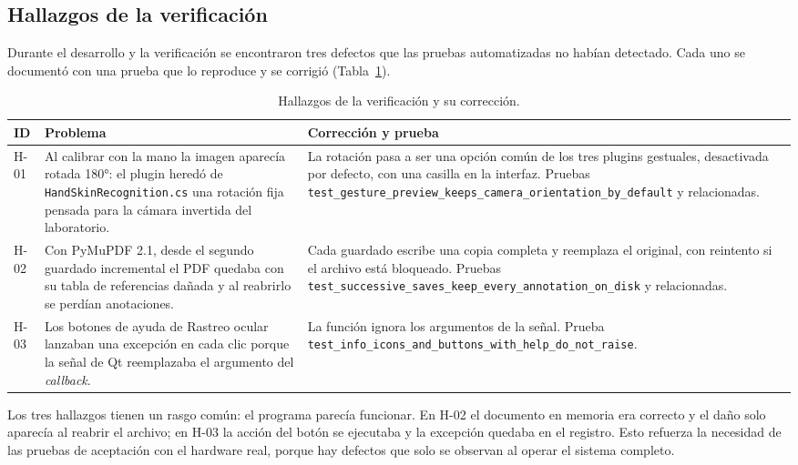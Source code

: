 \subsection{Hallazgos de la verificación}
\label{sec:hallazgos}

Durante el desarrollo y la verificación se encontraron tres defectos que las pruebas automatizadas no habían detectado. Cada uno se documentó con una prueba que lo reproduce y se corrigió (Tabla~\ref{tab:hallazgos_verif}).

\begin{table}[H]
\centering
\caption{Hallazgos de la verificación y su corrección.}
\label{tab:hallazgos_verif}
\footnotesize
\begin{tabularx}{\textwidth}{>{\raggedright\arraybackslash}p{1.1cm} >{\raggedright\arraybackslash}X >{\raggedright\arraybackslash}X}
\toprule
\textbf{ID} & \textbf{Problema} & \textbf{Corrección y prueba} \\ \midrule
H-01 & Al calibrar con la mano la imagen aparecía rotada 180°: el plugin heredó de \texttt{HandSkinRecognition.cs} una rotación fija pensada para la cámara invertida del laboratorio. & La rotación pasa a ser una opción común de los tres plugins gestuales, desactivada por defecto, con una casilla en la interfaz. Pruebas \texttt{test\_gesture\_preview\_keeps\_camera\_orientation\_by\_default} y relacionadas. \\ \midrule
H-02 & Con PyMuPDF 2.1, desde el segundo guardado incremental el PDF quedaba con su tabla de referencias dañada y al reabrirlo se perdían anotaciones. & Cada guardado escribe una copia completa y reemplaza el original, con reintento si el archivo está bloqueado. Pruebas \texttt{test\_successive\_saves\_keep\_every\_annotation\_on\_disk} y relacionadas. \\ \midrule
H-03 & Los botones de ayuda de Rastreo ocular lanzaban una excepción en cada clic porque la señal de Qt reemplazaba el argumento del \textit{callback}. & La función ignora los argumentos de la señal. Prueba \texttt{test\_info\_icons\_and\_buttons\_with\_help\_do\_not\_raise}. \\ \bottomrule
\end{tabularx}
\end{table}

Los tres hallazgos tienen un rasgo común: el programa parecía funcionar. En H-02 el documento en memoria era correcto y el daño solo aparecía al reabrir el archivo; en H-03 la acción del botón se ejecutaba y la excepción quedaba en el registro. Esto refuerza la necesidad de las pruebas de aceptación con el hardware real, porque hay defectos que solo se observan al operar el sistema completo.


